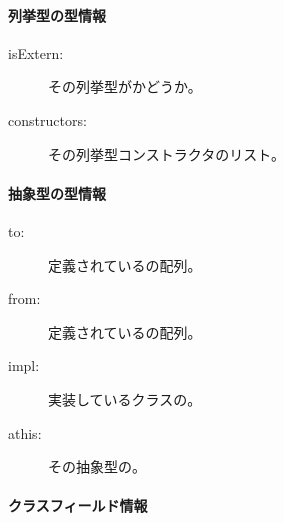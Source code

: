 \paragraph{列挙型の型情報}

\begin{description}
	\item[isExtern:] その列挙型がかどうか。
	\item[constructors:] その列挙型コンストラクタのリスト。
\end{description}

\paragraph{抽象型の型情報}

\begin{description}
	\item[to:] 定義されているの配列。
	\item[from:] 定義されているの配列。
	\item[impl:] 実装しているクラスの。
	\item[athis:] その抽象型の。
\end{description}
	
	
\paragraph{クラスフィールド情報}
\label{cr-rtti-class-field-information}

